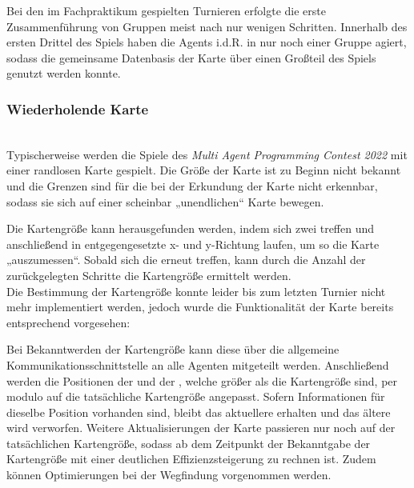 Bei den im Fachpraktikum gespielten Turnieren erfolgte die erste Zusammenführung von Gruppen meist nach nur wenigen Schritten. Innerhalb des ersten Drittel des Spiels haben die Agents i.d.R. in nur noch einer Gruppe agiert, sodass die gemeinsame Datenbasis der Karte über einen Großteil des Spiels genutzt werden konnte. 

\subsubsection{Wiederholende Karte} ~\\
Typischerweise werden die Spiele des \textit{Multi Agent Programming Contest 2022} mit einer randlosen Karte gespielt. Die Größe der Karte ist zu Beginn nicht bekannt und die Grenzen sind für die \Agents bei der Erkundung der Karte nicht erkennbar, sodass sie sich auf einer scheinbar „unendlichen“ Karte bewegen.\newline

Die Kartengröße kann herausgefunden werden, indem sich zwei \Agents treffen und anschließend in entgegengesetzte x- und y-Richtung laufen, um so die Karte „auszumessen“. Sobald sich die \Agents erneut treffen, kann durch die Anzahl der zurückgelegten Schritte die Kartengröße ermittelt werden. \\ Die Bestimmung der Kartengröße konnte leider bis zum letzten Turnier nicht mehr implementiert werden, jedoch wurde die Funktionalität der Karte bereits entsprechend vorgesehen: \newline

Bei Bekanntwerden der Kartengröße kann diese über die allgemeine Kommunikationsschnittstelle an alle Agenten mitgeteilt werden. Anschließend werden die Positionen der \NextMapTiles und der \Agents, welche größer als die Kartengröße sind, per modulo auf die tatsächliche Kartengröße angepasst. Sofern Informationen für dieselbe Position vorhanden sind, bleibt das aktuellere \NextMapTile erhalten und das ältere wird verworfen. Weitere Aktualisierungen der Karte passieren nur noch auf der tatsächlichen Kartengröße, sodass ab dem Zeitpunkt der Bekanntgabe der Kartengröße mit einer deutlichen Effizienzsteigerung zu rechnen ist. Zudem können Optimierungen bei der Wegfindung vorgenommen werden.  


